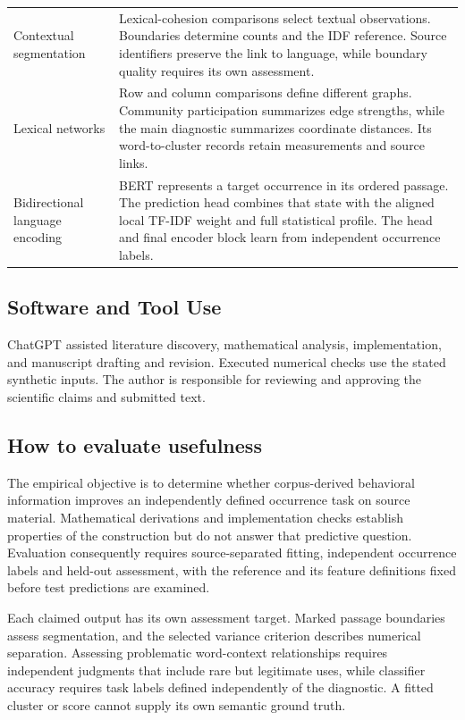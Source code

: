 \documentclass[10pt,letterpaper]{article}
\begin{document}
\begin{longtable}{@{}p{124pt}p{332pt}@{}}
Contextual segmentation & Lexical-cohesion comparisons select textual observations. Boundaries determine counts and the IDF reference. Source identifiers preserve the link to language, while boundary quality requires its own assessment.\\[4pt]
Lexical networks & Row and column comparisons define different graphs. Community participation summarizes edge strengths, while the main diagnostic summarizes coordinate distances. Its word-to-cluster records retain measurements and source links.\\[4pt]
Bidirectional language encoding & BERT represents a target occurrence in its ordered passage. The prediction head combines that state with the aligned local TF-IDF weight and full statistical profile. The head and final encoder block learn from independent occurrence labels.\\[4pt]
\bottomrule
\end{longtable}
\endgroup
\subsection{Software and Tool Use}
ChatGPT assisted literature discovery, mathematical analysis, implementation, and manuscript drafting and revision. Executed numerical checks use the stated synthetic inputs. The author is responsible for reviewing and approving the scientific claims and submitted text.\par

\subsection{How to evaluate usefulness}
The empirical objective is to determine whether corpus-derived behavioral information improves an independently defined occurrence task on source material. Mathematical derivations and implementation checks establish properties of the construction but do not answer that predictive question. Evaluation consequently requires source-separated fitting, independent occurrence labels and held-out assessment, with the reference and its feature definitions fixed before test predictions are examined.\par

Each claimed output has its own assessment target. Marked passage boundaries assess segmentation, and the selected variance criterion describes numerical separation. Assessing problematic word-context relationships requires independent judgments that include rare but legitimate uses, while classifier accuracy requires task labels defined independently of the diagnostic. A fitted cluster or score cannot supply its own semantic ground truth.\par
\end{document}

